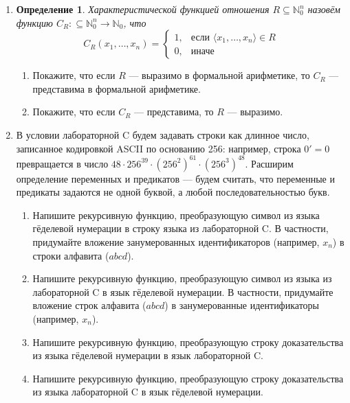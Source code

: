 \documentclass[10pt,a4paper,oneside]{article}
\newtheorem{definition}{Определение}
\begin{document}
\begin{enumerate}
\item \begin{definition}Характеристической функцией отношения $R \subseteq \mathbb{N}^n_0$ назовём функцию 
$C_R: \subseteq\mathbb{N}^n_0 \rightarrow \mathbb{N}_0$, что 
$$C_R(x_1,\dots,x_n) = \left\{\begin{array}{ll}1,&\mbox{если }\langle x_1,\dots,x_n\rangle \in R\\
                                               0,&\mbox{иначе}\end{array}\right.$$
\end{definition}

\begin{enumerate}
\item Покажите, что если $R$ --- выразимо в формальной арифметике, то $C_R$ --- представима в формальной арифметике.
\item Покажите, что если $C_R$ --- представима, то $R$ --- выразимо.
\end{enumerate}

\item В условии лабораторной C будем задавать строки как длинное число, записанное кодировкой ASCII по основанию 256:
например, строка $0'=0$ превращается в число $48 \cdot 256^{39} \cdot {(256^2)}^{61} \cdot {(256^3)}^{48}$.
Расширим определение переменных и предикатов — будем считать, что переменные и предикаты задаются не одной буквой,
а любой последовательностью букв.
\begin{enumerate}
\item Напишите рекурсивную функцию, преобразующую символ из языка гёделевой нумерации в строку языка из лабораторной C.
В частности, придумайте вложение занумерованных идентификаторов (например, $x_n$) в строки алфавита ($abcd$).
\item Напишите рекурсивную функцию, преобразующую символ из языка из лабораторной C в язык гёделевой нумерации.
В частности, придумайте вложение строк алфавита ($abcd$) в занумерованные идентификаторы (например, $x_n$).
\item Напишите рекурсивную функцию, преобразующую строку доказательства из языка гёделевой нумерации в язык лабораторной C.
\item Напишите рекурсивную функцию, преобразующую строку доказательства из языка лабораторной C в язык гёделевой нумерации.
\end{enumerate}


\end{enumerate}
\end{document}
